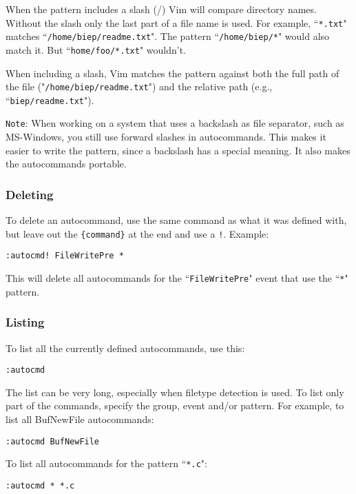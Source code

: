 When the pattern includes a slash (/) Vim will compare directory names.
Without the slash only the last part of a file name is used.
For example, ``\texttt{*.txt}" matches ``\texttt{/home/biep/readme.txt}".
The pattern ``\texttt{/home/biep/*}" would also match it.
But ``\texttt{home/foo/*.txt}" wouldn't.

When including a slash, Vim matches the pattern against both the full path of the file ("\texttt{/home/biep/readme.txt}") and the relative path (e.g., ``\texttt{biep/readme.txt}").

\texttt{Note}: When working on a system that uses a backslash as file separator, such as MS-Windows, you still use forward slashes in autocommands.
This makes it easier to write the pattern, since a backslash has a special meaning.
It also makes the autocommands portable.

\subsubsection{Deleting}
To delete an autocommand, use the same command as what it was defined with, but leave out the \texttt{\{command\}} at the end and use a \texttt{!}.
Example:

\begin{Verbatim}[samepage=true]
 :autocmd! FileWritePre *
\end{Verbatim}

This will delete all autocommands for the ``\texttt{FileWritePre}" event that use the ``\texttt{*}" pattern.
\subsubsection{Listing}
To list all the currently defined autocommands, use this:

\begin{Verbatim}[samepage=true]
 :autocmd
\end{Verbatim}

The list can be very long, especially when filetype detection is used.
To list only part of the commands, specify the group, event and/or pattern.
For example, to list all BufNewFile autocommands:

\begin{Verbatim}[samepage=true]
 :autocmd BufNewFile
\end{Verbatim}

To list all autocommands for the pattern ``\texttt{*.c}":

\begin{Verbatim}[samepage=true]
 :autocmd * *.c
\end{Verbatim}

